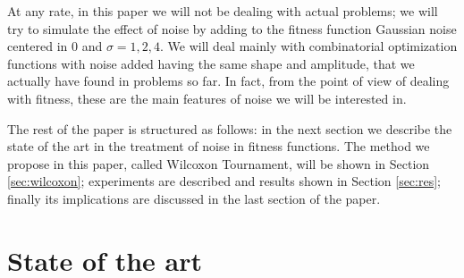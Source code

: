 \documentclass{llncs}
\begin{document}
At any rate, in this paper we will not be dealing with actual
problems; we will try to simulate the effect of noise by adding to the fitness function Gaussian noise centered in 0 and $\sigma=1,2,4$. We will deal mainly with combinatorial optimization functions with noise added having the same shape and amplitude,
that we actually have found in problems so far. In fact, from the
point of view of dealing with fitness, these are the main features of
noise we will be interested in. 

The rest of the paper is structured as follows: in the next section we describe the
state of the art in the treatment of noise in fitness functions. The
method we propose in this paper, called Wilcoxon Tournament, will be
shown in Section \ref{sec:wilcoxon}; experiments are described and
results shown in Section \ref{sec:res}; finally its implications are discussed in the last section of the paper. 


\section{State of the art}
\label{sec:soa}
\end{document}
